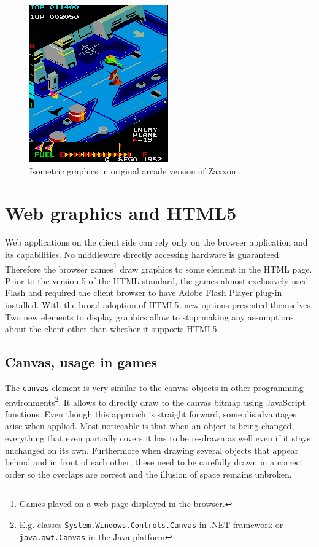 \documentclass[11pt,oneside, final]{fithesis2}
\begin{document}
\begin{figure}[h]
	\centering
	\includegraphics{zaxxon}
	\caption{Isometric graphics in original arcade version of Zaxxon\cite{zaxxon}}
	\label{zaxxon}
\end{figure}

\section{Web graphics and HTML5}
Web applications on the client side can rely only on the browser application and its capabilities. No middleware directly accessing hardware is guaranteed. Therefore the browser games\footnote{Games played on a web page displayed in the browser.} draw graphics to some element in the HTML page. Prior to the version 5 of the HTML standard, the games almost exclusively used Flash and required the client browser to have Adobe Flash Player plug-in installed\cite{flashplayer}. With the broad adoption of HTML5, new options presented themselves. Two new elements to display graphics allow to stop making any assumptions about the client other than whether it supports HTML5.

\subsection{Canvas, usage in games}
The \texttt{canvas} element is very similar to the canvas objects in other programming environments\footnote{E.g. classes \texttt{System.Windows.Controls.Canvas} in .NET framework\cite{net_canvas} or \texttt{java.awt.Canvas} in the Java platform\cite{java_canvas}}. It allows to directly draw to the canvas bitmap using JavaScript functions. Even though this approach is straight forward, some disadvantages arise when applied. Most noticeable is that when an object is being changed, everything that even partially covers it has to be re-drawn as well even if it stays unchanged on its own. Furthermore when drawing several objects that appear behind and in front of each other, these need to be carefully drawn in a correct order so the overlaps are correct and the illusion of space remains unbroken.
\end{document}
